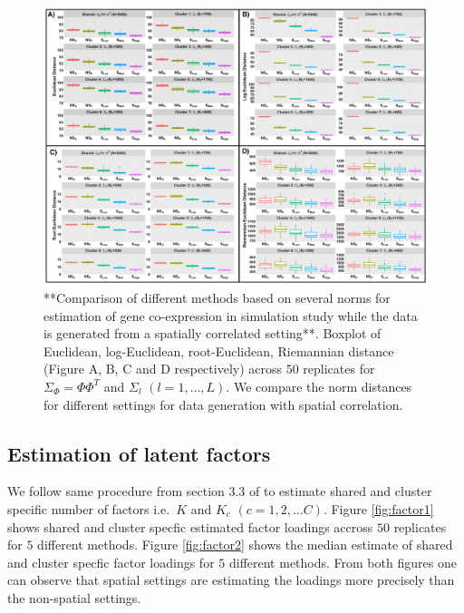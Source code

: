 \documentclass[
]{book}
\begin{document}
\begin{figure}

{\centering \includegraphics[width=0.8\linewidth]{images/Norm_plot_rev} 

}

\caption{ **Comparison of different methods based on several norms for estimation of gene co-expression in simulation study while the data is generated from a spatially correlated setting**. Boxplot of Euclidean, log-Euclidean,  root-Euclidean, Riemannian distance (Figure A, B, C and D respectively) across  $50$ replicates for $\Sigma_{\Phi} = \Phi \Phi^{T}$ and $\Sigma_{l}$ $(l = 1, \dots , L)$. We compare the norm distances for different settings for data generation with spatial correlation.}\label{fig:AllEuclid}
\end{figure}

\hypertarget{estimation-of-latent-factors}{%
\subsection{Estimation of latent factors}\label{estimation-of-latent-factors}}

We follow same procedure from section 3.3 of \citet{de2018bayesian} to estimate shared and cluster specific number of factors i.e.~\(K\) and \(K_{c}\) \((c=1,2, \dots C)\). Figure \ref{fig:factor1} shows shared and cluster specfic estimated factor loadings accross \(50\) replicates for \(5\) different methods. Figure \ref{fig:factor2} shows the median estimate of shared and cluster specfic factor loadings for \(5\) different methods. From both figures one can observe that spatial settings are estimating the loadings more precisely than the non-spatial settings.
\end{document}
